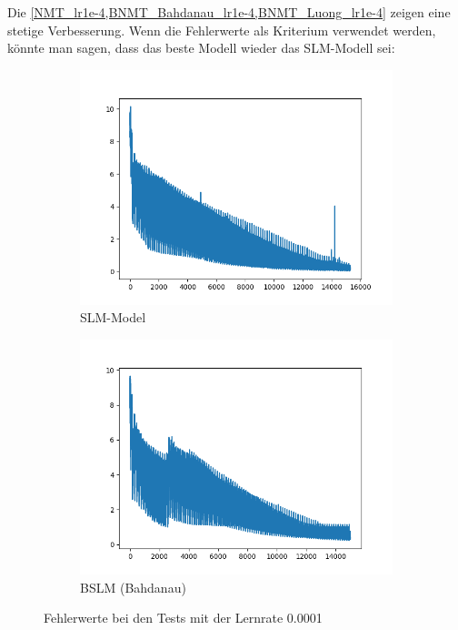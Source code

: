 Die \cref{NMT_lr1e-4,BNMT_Bahdanau_lr1e-4,BNMT_Luong_lr1e-4} zeigen eine stetige Verbesserung. Wenn die Fehlerwerte als Kriterium verwendet werden, könnte man sagen, dass das beste Modell wieder das SLM-Modell sei:
\begin{figure}[H]
	\centering
	\begin{subfigure}[b]{\textwidth}
		\centering
		\includegraphics[scale=0.55]{images/slm_1e-4_101EP.png}
		\caption{SLM-Model}
		\label{NMT_lr1e-4}
	\end{subfigure}
	\begin{subfigure}[b]{\textwidth}
		\centering
		\includegraphics[scale=0.55]{images/bslm_bahdanau_1e_4_100EP.png}
		\caption{BSLM (Bahdanau)}
		\label{BNMT_Bahdanau_lr1e-4}
	\end{subfigure}
	\caption{Fehlerwerte bei den Tests mit der Lernrate 0.0001}
	\label{fig:lr_0001}
\end{figure}
